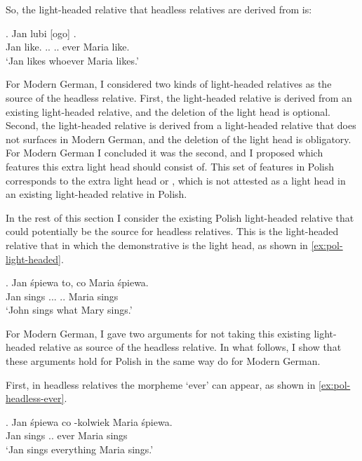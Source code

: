 So, the light-headed relative that headless relatives are derived from is:

\exg. Jan lubi [ogo]    .\\
Jan like.\scsub{[acc]} .. .. ever Maria like.\scsub{[acc]}\\
`Jan likes whoever Maria likes.' \label{ex:pol-elh-rp}

For Modern German, I considered two kinds of light-headed relatives as the source of the headless relative.
First, the light-headed relative is derived from an existing light-headed relative, and the deletion of the light head is optional. Second, the light-headed relative is derived from a light-headed relative that does not surfaces in Modern German, and the deletion of the light head is obligatory.
For Modern German I concluded it was the second, and I proposed which features this extra light head should consist of. This set of features in Polish corresponds to the extra light head  or , which is not attested as a light head in an existing light-headed relative in Polish.

In the rest of this section I consider the existing Polish light-headed relative that could potentially be the source for headless relatives. This is the light-headed relative that in which the demonstrative is the light head, as shown in \ref{ex:pol-light-headed}.

\exg. Jan śpiewa to, co Maria śpiewa.\\
Jan sings ... .. Maria sings\\
`John sings what Mary sings.' \label{ex:pol-light-headed}

For Modern German, I gave two arguments for not taking this existing light-headed relative as source of the headless relative. In what follows, I show that these arguments hold for Polish in the same way do for Modern German.

First, in headless relatives the morpheme  `ever' can appear, as shown in \ref{ex:pol-headless-ever}.

\exg. Jan śpiewa co -kolwiek Maria śpiewa.\\
Jan sings .. ever Maria sings\\
`Jan sings everything Maria sings.' \label{ex:pol-headless-ever}


